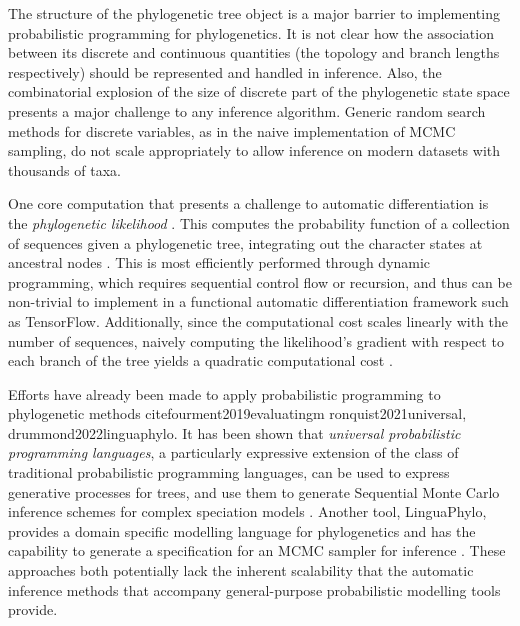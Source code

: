 The structure of the phylogenetic tree object is a major barrier to implementing probabilistic programming for phylogenetics. It is not clear how the association between its discrete and continuous quantities (the topology and branch lengths respectively) should be represented and handled in inference. Also, the combinatorial explosion of the size of discrete part of the phylogenetic state space presents a major challenge to any inference algorithm. Generic random search methods for discrete variables, as in the naive implementation of MCMC sampling, do not scale appropriately to allow inference on modern datasets with thousands of taxa.

One core computation that presents a challenge to automatic differentiation is the \textit{phylogenetic likelihood} \cite{felsenstein1981evolutionary}. This computes the probability function of a collection of sequences given a phylogenetic tree, integrating out the character states at ancestral nodes . This is most efficiently performed through dynamic programming, which requires sequential control flow or recursion, and thus can be non-trivial to implement in a functional automatic differentiation framework such as TensorFlow. Additionally, since the computational cost scales linearly with the number of sequences, naively computing the likelihood's gradient with respect to each branch of the tree yields a quadratic computational cost \cite{ji2020gradients}.

Efforts have already been made to apply probabilistic programming to phylogenetic methods
cite{fourment2019evaluatingm ronquist2021universal, drummond2022linguaphylo}. It has been shown that \textit{universal probabilistic programming languages}, a particularly expressive extension of the class of traditional probabilistic programming languages, can be used to express generative processes for trees, and use them to generate Sequential Monte Carlo inference schemes for complex speciation models \cite{ronquist2021universal}. Another tool, LinguaPhylo, provides a domain specific modelling language for phylogenetics and has the capability to generate a specification for an MCMC sampler for inference \cite{drummond2022linguaphylo}. These approaches both potentially lack the inherent scalability that the automatic inference methods that accompany general-purpose probabilistic modelling tools provide.

